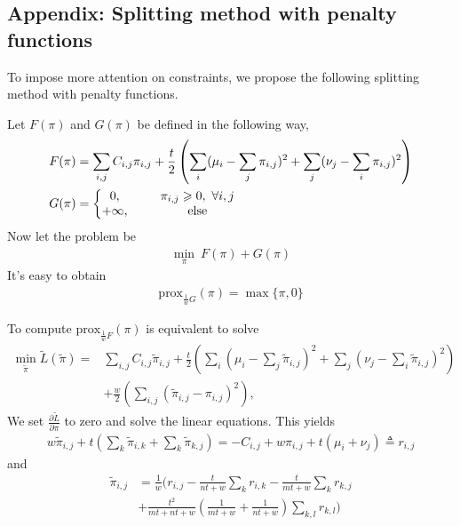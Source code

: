 \documentclass[english]{pkupaper}
\newenvironment{eqt}{\begin{equation}\begin{aligned}}{\end{aligned}\end{equation}}
\begin{document}
\printbibliography
\begin{appendix}
\section*{Appendix: Splitting method with penalty functions}

To impose more attention on constraints, we propose the following splitting method with penalty functions.

Let $F(\pi)$ and $G(\pi)$ be defined in the following way,
\begin{eqt}
& F(\pi) = \sum_{i, j}C_{i,j}\pi_{i,j} + \frac{t}{2}\left(\sum_{i}(\mu_i-\sum_{j}\pi_{i,j})^2 + \sum_{j}(\nu_j-\sum_{i}\pi_{i,j})^2\right) \\
& G(\pi) = 
\left\{
\begin{matrix}
0, \indent &\pi_{i, j}\geqslant0,\ \forall i, j\\
+\infty, \indent &\text{else}
\end{matrix}
\right.
\end{eqt}
Now let the problem be
\begin{eqt}
\min_\pi \ F(\pi) + G(\pi)
\end{eqt}
It's easy to obtain
\begin{eqt}
\text{prox}_{\frac{1}{w}G}(\pi) = \max\{\pi, 0\} \label{proxg}
\end{eqt}

To compute $\text{prox}_{\frac{1}{w}F}(\pi)$ is equivalent to solve
\begin{eqt}
\min_{\tilde{\pi}} \tilde L(\tilde{\pi}) = & \sum_{i, j}C_{i,j}\tilde\pi_{i,j} + \frac{t}{2}\left(\sum_{i}(\mu_i-\sum_{j}\tilde\pi_{i,j})^2 + \sum_{j}(\nu_j-\sum_{i}\tilde\pi_{i,j})^2\right) \\&+ \frac{w}{2}\left(\sum_{i, j}(\tilde{\pi}_{i, j} - \pi_{i, j})^2\right),
\end{eqt}
We set $\frac{\partial \tilde{L}}{\partial \pi}$ to zero and solve the linear equations. This yields
\begin{eqt}
w\tilde{\pi}_{i, j} + t\left(\sum_k\tilde{\pi}_{i, k}+\sum_k\tilde{\pi}_{k, j}\right) = -C_{i, j} + w\pi_{i, j} + t(\mu_i+\nu_j) \triangleq r_{i, j}
\end{eqt}
and 
\begin{eqt}
\tilde{\pi}_{i, j} & = \frac{1}{w}(r_{i, j}-\frac{t}{nt+w}\sum_kr_{i, k} - \frac{t}{mt+w}\sum_kr_{k, j}\\
& + \frac{t^2}{mt+nt+w}(\frac{1}{mt+w}+\frac{1}{nt+w})\sum_{k, l}r_{k, l}) \label{proxf}
\end{eqt}


\end{appendix}
\end{document}
